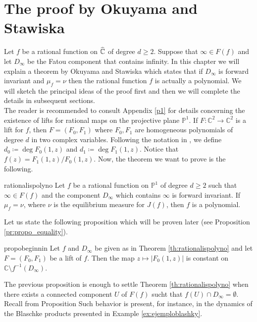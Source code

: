 \section{The proof by Okuyama and Stawiska}\label{inicio}

Let $f$ be a rational function on $\widehat{\mathbb{C}}$ of degree $d\geq 2$. Suppose that $\infty \in F(f)$ and let $D_\infty$ be the Fatou component that contains infinity. In this chapter we will explain a theorem by Okuyama and Stawiska \cite{okuyama} which states that if $D_\infty$ is forward invariant and $\mu_f = \nu$ then the rational function $f$ is actually a polynomial. We will sketch the principal ideas of the proof first and then we will complete the details in subsequent sections.\\

The reader is recommended to consult Appendix \ref{p1} for details concerning the existence of lifts for rational maps on the projective plane $\mathbb{P}^1$. If $F:\mathbb{C}^2 \rightarrow \mathbb{C}^2$ is a lift for $f$, then $F=(F_0,F_1)$ where $F_0,F_1$ are homogeneous polynomials of degree $d$ in two complex variables. Following the notation in \cite{okuyama}, we define $d_0 \coloneqq \deg F_0(1,z)$ and $d_1 \coloneqq \deg F_1(1,z)$. Notice that $f(z) = F_1(1,z)/F_0(1,z)$. Now, the theorem we want to prove is the following.\\

\begin{mytheo}{}{rationalispolyno}
Let $f$ be a rational function on $\mathbb{P}^1$ of degree $d\geq 2$ such that $\infty\in F(f)$ and the component $D_\infty$ which contains $\infty$ is forward invariant. If $\mu_f=\nu$, where $\nu$ is the equilibrium measure for $J(f)$, then $f$ is a polynomial.
\end{mytheo}

Let us state the following proposition which will be proven later (see Proposition \ref{pr:propo_equality}).

\begin{myprop}{}{propobeginnin}
Let $f$ and $D_\infty$ be given as in Theorem \ref{th:rationalispolyno} and let $F = (F_0,F_1)$ be a lift of $f$. Then the map $z\mapsto |F_0(1,z)|$ is constant on $\mathbb{C}\setminus f^{-1}(D_\infty)$.
\end{myprop}

The previous proposition is enough to settle Theorem \ref{th:rationalispolyno} when there exists a connected component $U$ of $F(f)$ sucht that $f(U) \cap D_\infty = \emptyset$. Recall from Proposition   Such behavior is present, for instance, in the dynamics of the Blaschke products presented in Example \ref{ex:ejemploblashky}.

